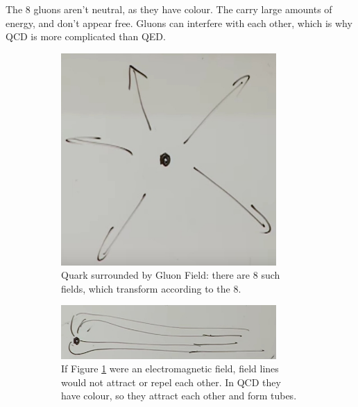 \documentclass[]{article}
\begin{document}
The 8 gluons aren't neutral, as they have colour. The carry large amounts of energy, and don't appear free. Gluons can interfere with each other, which is why QCD is more complicated than QED.
 
\begin{figure}[H]
	\caption{Why QCD is more complicated than QED}
	\begin{subfigure}{0.45\textwidth}
		\caption[Quark surrounded by Gluon Field]{Quark surrounded by Gluon Field: there are 8 such fields, which transform according to the 8.}\label{fig:2-4-quark-gluon-field}
		\includegraphics[width=0.9\textwidth]{2-4-quark-gluon-field}
	\end{subfigure}
	\begin{subfigure}{0.45\textwidth}
		\caption{If Figure \ref{fig:2-4-quark-gluon-field} were an electromagnetic field, field lines would not attract or repel each other. In QCD they have colour, so they attract each other and form tubes.}
		\includegraphics[width=0.9\textwidth]{2-4-quark-gluon-field-tubes}
	\end{subfigure}
	\begin{subfigure}{0.45\textwidth}

\end{subfigure}
\end{figure}
\end{document}
